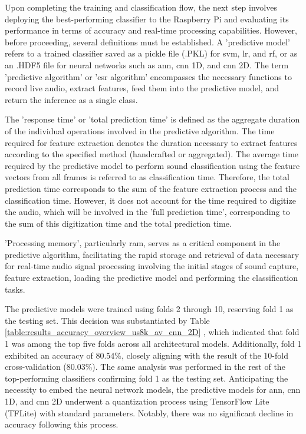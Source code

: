 Upon completing the training and classification flow, the next step involves deploying the best-performing classifier to the Raspberry Pi and evaluating its performance in terms of accuracy and real-time processing capabilities. However, before proceeding, several definitions must be established. A 'predictive model' refers to a trained classifier saved as a pickle file (.PKL) for \gls{svm}, \gls{lr}, and \gls{rf}, or as an .HDF5 file for neural networks such as \gls{ann}, \gls{cnn} 1D, and \gls{cnn} 2D. The term 'predictive algorithm' or '\gls{esr} algorithm' encompasses the necessary functions to record live audio, extract features, feed them into the predictive model, and return the inference as a single class.

The 'response time' or 'total prediction time' is defined as the aggregate duration of the individual operations involved in the predictive algorithm. The time required for feature extraction denotes the duration necessary to extract features according to the specified method (handcrafted or aggregated). The average time required by the predictive model to perform sound classification using the feature vectors from all frames is referred to as classification time. Therefore, the total prediction time corresponds to the sum of the feature extraction process and the classification time. However, it does not account for the time required to digitize the audio, which will be involved in the 'full prediction time', corresponding to the sum of this digitization time and the total prediction time.

'Processing memory', particularly \gls{ram}, serves as a critical component in the predictive algorithm, facilitating the rapid storage and retrieval of data necessary for real-time audio signal processing involving the initial stages of sound capture, feature extraction, loading the predictive model and performing the classification tasks.

The predictive models were trained using folds 2 through 10, reserving fold 1 as the testing set. This decision was substantiated by Table \ref{table:results_accuracy_overview_us8k_av_cnn_2D} , which indicated that fold 1 was among the top five folds across all architectural models. Additionally, fold 1 exhibited an accuracy of 80.54\%, closely aligning with the result of the 10-fold cross-validation (80.03\%). The same analysis was performed in the rest of the top-performing classifiers confirming fold 1 as the testing set. Anticipating the necessity to embed the neural network models, the predictive models for \gls{ann}, \gls{cnn} 1D, and \gls{cnn} 2D underwent a quantization process using TensorFlow Lite (TFLite) with standard parameters. Notably, there was no significant decline in accuracy following this process.

